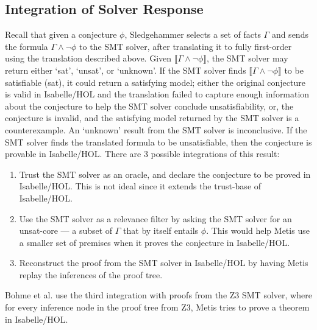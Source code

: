 \documentclass[11pt]{article}
\begin{document}
	\subsection{Integration of Solver Response}
	Recall that given a conjecture $\phi$, 
	Sledgehammer selects a set of facts 
	$\Gamma$ and sends the formula 
	$\Gamma \land \neg \phi$ to the SMT solver,
	after translating it to fully first-order
	using the translation described above.
	Given $\llbracket \Gamma \land 
	\neg \phi \rrbracket$, the SMT solver may 
	return either `sat', `unsat',
	or `unknown'. If the SMT solver finds 
	$\llbracket \Gamma \land 
	\neg \phi \rrbracket$ to be satisfiable
	(sat), it could return a satisfying model;
	either the original conjecture is valid
	in Isabelle/HOL and the translation 
	failed to capture enough information
	about the conjecture to help the 
	SMT solver conclude unsatisfiability, 
	or, the conjecture is invalid, and the 
	satisfying model returned by the SMT 
	solver is a counterexample. An 
	`unknown' result from the SMT 
	solver is inconclusive. If the
	SMT solver finds the translated
	formula to be unsatisfiable, then 
	the conjecture is provable in
	Isabelle/HOL. There are 3 possible 
	integrations of this result:
	\begin{enumerate}
		\item Trust the SMT solver as an oracle, 
		and declare the conjecture to be proved in 
		Isabelle/HOL. This is not ideal since 
		it extends the trust-base of Isabelle/HOL.
		\item Use the SMT solver as a relevance 
		filter by asking the SMT solver for 
		an unsat-core --- a subset of 
		$\Gamma$ that by itself entails $\phi$.
		This would help Metis use a smaller
		set of premises when it proves the 
		conjecture in Isabelle/HOL.
		\item Reconstruct the proof from the 
		SMT solver in Isabelle/HOL by having
		Metis replay the inferences of 
		the proof tree.
	\end{enumerate}
	Bohme et al. use the third integration 
	with proofs from the Z3 SMT solver, 
	where for every inference node in the 
	proof tree from Z3, Metis tries to prove 
	a theorem in Isabelle/HOL.
	
	
	
	
\end{document}
